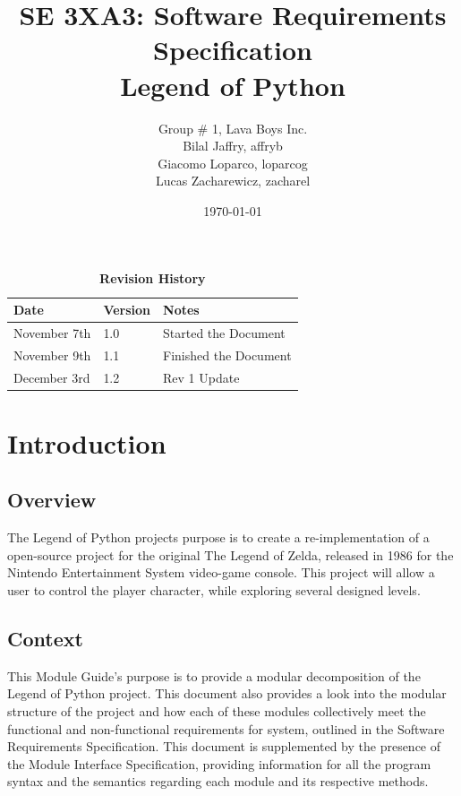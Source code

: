 \documentclass[12pt, titlepage]{article}
\title{SE 3XA3: Software Requirements Specification\\Legend of Python}
\author{Group \# 1, Lava Boys Inc.
    \\ Bilal Jaffry, affryb
    \\ Giacomo Loparco, loparcog
    \\ Lucas Zacharewicz, zacharel
}
\date{\today}
\begin{document}
\maketitle

\tableofcontents
\listoftables
\listoffigures
\begin{table}[hbp]
\caption{\bf Revision History}
\begin{tabularx}{\textwidth}{p{3cm}p{2cm}X}
\toprule {\bf Date} & {\bf Version} & {\bf Notes}\\
\midrule
November 7th & 1.0 & Started the Document\\
November 9th & 1.1 & Finished the Document\\
December 3rd & 1.2 & Rev 1 Update\\
\bottomrule
\end{tabularx}
\end{table}


\newpage


\section{Introduction}
\subsection{Overview}
The Legend of Python projects purpose is to create a re-implementation of a open-source project for the original The Legend of Zelda, released in 1986 for the Nintendo Entertainment System video-game console. This project will allow a user to control the player character, while exploring several designed levels.
\subsection{Context}
This Module Guide's purpose is to provide a modular decomposition of the Legend of Python project. This document also provides a look into the modular structure of the project and how each of these modules collectively meet the functional and non-functional requirements for system, outlined in the Software Requirements Specification. This document is supplemented by the presence of the Module Interface Specification, providing information for all the program syntax and the semantics regarding each module and its respective methods. 
\end{document}
